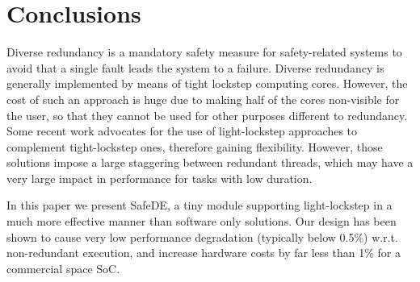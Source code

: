\section{Conclusions}
\label{sec:concl}

Diverse redundancy is a mandatory safety measure for safety-related systems to avoid that a single fault leads the system to a failure. Diverse redundancy is generally implemented by means of tight lockstep computing cores. However, the cost of such an approach is huge due to making half of the cores non-visible for the user, so that they cannot be used for other purposes different to redundancy.
Some recent work advocates for the use of light-lockstep approaches to complement tight-lockstep ones, therefore gaining flexibility. However, those solutions impose a large staggering between redundant threads, which may have a very large impact in performance for tasks with low duration.

In this paper we present SafeDE, a tiny module supporting light-lockstep in a much more effective manner than software only solutions. Our design has been shown to cause very low performance degradation (typically below 0.5\%) w.r.t. non-redundant execution, and increase hardware costs by far less than 1\% for a commercial space SoC.

